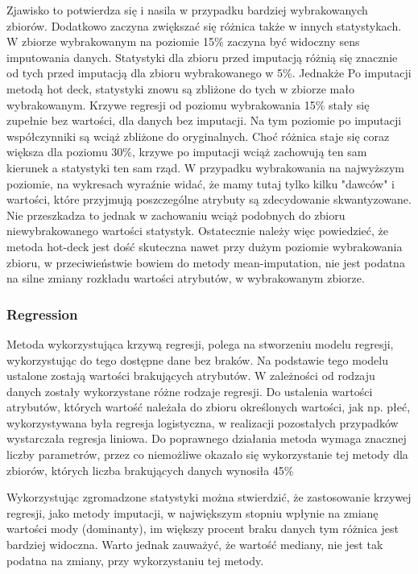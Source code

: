 \documentclass{classrep}
\begin{document}
{{            Zjawisko to potwierdza się i nasila w przypadku bardziej wybrakowanych zbiorów. Dodatkowo zaczyna zwiększać się różnica także w innych statystykach. W zbiorze wybrakowanym na poziomie 15\% zaczyna być widoczny sens imputowania danych. Statystyki dla zbioru przed imputacją różnią się znacznie od tych przed imputacją dla zbioru wybrakowanego w 5\%. Jednakże Po imputacji metodą hot deck, statystyki znowu są zbliżone do tych w zbiorze mało wybrakowanym. Krzywe regresji od poziomu wybrakowania 15\% stały się zupełnie bez wartości, dla danych bez imputacji. Na tym poziomie po imputacji współczynniki są wciąż zbliżone do oryginalnych. Choć różnica staje się coraz większa dla poziomu 30\%, krzywe po imputacji wciąż zachowują ten sam kierunek a statystyki ten sam rząd. W przypadku wybrakowania na najwyższym poziomie, na wykresach wyraźnie widać, że mamy tutaj tylko kilku "dawców" i wartości, które przyjmują poszczególne atrybuty są zdecydowanie skwantyzowane. Nie przeszkadza to jednak w zachowaniu wciąż podobnych do zbioru niewybrakowanego wartości statystyk. Ostatecznie należy więc powiedzieć, że metoda hot-deck jest dość skuteczna nawet przy dużym poziomie wybrakowania zbioru, w przeciwieństwie bowiem do metody mean-imputation, nie jest podatna na silne zmiany rozkładu wartości atrybutów, w wybrakowanym zbiorze.

        }

        \subsubsection{Regression}
        \label{summary:regression} {
            Metoda wykorzystująca krzywą regresji, polega na stworzeniu modelu regresji, wykorzystując do tego dostępne dane bez braków. Na podstawie tego modelu ustalone zostają wartości brakujących atrybutów. W zależności od rodzaju danych zostały wykorzystane różne rodzaje regresji. Do ustalenia wartości atrybutów, których wartość należała do zbioru określonych wartości, jak np. płeć, wykorzystywana była regresja logistyczna, w realizacji pozostałych przypadków wystarczała regresja liniowa. Do poprawnego działania metoda wymaga znacznej liczby parametrów, przez co niemożliwe okazało się wykorzystanie tej metody dla zbiorów, których liczba brakujących danych wynosiła 45\%

            Wykorzystując zgromadzone statystyki można stwierdzić, że zastosowanie krzywej regresji, jako metody imputacji, w największym stopniu wpłynie na zmianę wartości mody (dominanty), im większy procent braku danych tym różnica jest bardziej widoczna. Warto jednak zauważyć, że wartość mediany, nie jest tak podatna na zmiany, przy wykorzystaniu tej metody.
        }

}
\end{document}
